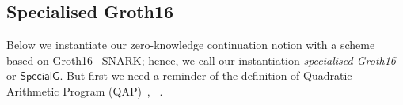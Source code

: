 \begin{definition}[ZK Continuations]
\begin{comment}
\begin{align*}
\mathit{Pr}(& A(\crs, \realaux, \pi', X', \relone) = 1 \ | \ (\crs, \pp) \leftarrow \ZKCont.\Setup (1^{\lambda}), \\
                  & (\crs, \crs) \leftarrow \ZKCont.\Gen(\crs, \relone), \\ 
                  & (\pi', X', \_) \leftarrow \ZKCont.\Reprove (\crs, X, \pi, b, \relone), \\
                  &  \ZKCont.\Verify(\crs, \bary, X, \pi, \relone) = 1) =  \\
= \mathit{Pr}(& A(\crs, \realaux, \pi', X', \relone) = 1 \ | \ (\crs, \pp) \leftarrow \ZKCont.\Setup (1^{\lambda}), \\ 
                     & (\crs, \crsvk) \leftarrow \ZKCont.\Gen(\crs, \relone), (\pi', X') \leftarrow \ZKCont.\Sim(\tw, \bary, \relone) \\ 
                     &  \ZKCont.\Verify(\crsvk, \bary, X, \pi, \relone) = 1)
\end{align*}
\end{comment}
 
\begin{comment} 
Maybe some remarks why we define ZK only for Reprove? Does it cover ZK for Preprove as well?
\end{comment}

\end{definition} 


\subsection{Specialised Groth16}
\label{sec:rvrf_groth16}

Below we instantiate our zero-knowledge continuation notion with a scheme based on Groth16~\cite{Groth16} SNARK;
hence, we call our instantiation \emph{specialised Groth16} or \emph{$\mathsf{SpecialG}$}. But first we need a 
reminder of the definition of Quadratic Arithmetic Program (QAP)~\cite{LegoSNARK}, ~\cite{GGPR13}.

